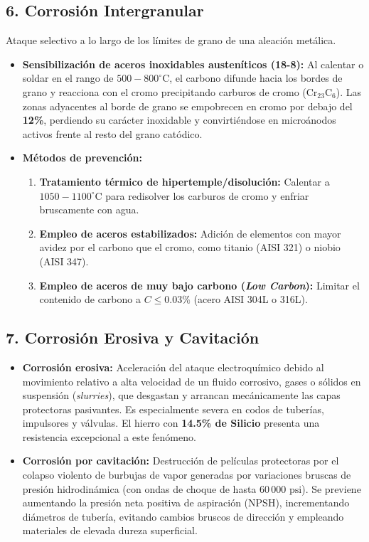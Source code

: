 \subsection{6. Corrosión Intergranular}
Ataque selectivo a lo largo de los límites de grano de una aleación metálica.
\begin{itemize}
    \item \textbf{Sensibilización de aceros inoxidables austeníticos (18-8):} Al calentar o soldar en el rango de $500 - 800^\circ\text{C}$, el carbono difunde hacia los bordes de grano y reacciona con el cromo precipitando carburos de cromo ($\text{Cr}_{23}\text{C}_6$). Las zonas adyacentes al borde de grano se empobrecen en cromo por debajo del \textbf{12\%}, perdiendo su carácter inoxidable y convirtiéndose en microánodos activos frente al resto del grano catódico.
    \item \textbf{Métodos de prevención:}
          \begin{enumerate}
              \item \textbf{Tratamiento térmico de hipertemple/disolución:} Calentar a $1050-1100^\circ\text{C}$ para redisolver los carburos de cromo y enfriar bruscamente con agua.
              \item \textbf{Empleo de aceros estabilizados:} Adición de elementos con mayor avidez por el carbono que el cromo, como titanio (AISI 321) o niobio (AISI 347).
              \item \textbf{Empleo de aceros de muy bajo carbono (\textit{Low Carbon}):} Limitar el contenido de carbono a $C \leq 0.03\%$ (acero AISI 304L o 316L).
          \end{enumerate}
\end{itemize}

\subsection{7. Corrosión Erosiva y Cavitación}
\begin{itemize}
    \item \textbf{Corrosión erosiva:} Aceleración del ataque electroquímico debido al movimiento relativo a alta velocidad de un fluido corrosivo, gases o sólidos en suspensión (\textit{slurries}), que desgastan y arrancan mecánicamente las capas protectoras pasivantes. Es especialmente severa en codos de tuberías, impulsores y válvulas. El hierro con \textbf{14.5\% de Silicio} presenta una resistencia excepcional a este fenómeno.
    \item \textbf{Corrosión por cavitación:} Destrucción de películas protectoras por el colapso violento de burbujas de vapor generadas por variaciones bruscas de presión hidrodinámica (con ondas de choque de hasta $60\,000\text{ psi}$). Se previene aumentando la presión neta positiva de aspiración (NPSH), incrementando diámetros de tubería, evitando cambios bruscos de dirección y empleando materiales de elevada dureza superficial.
\end{itemize}

